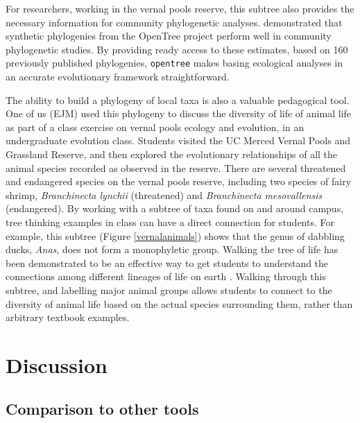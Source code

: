 \documentclass[oupdraft]{sysbio_sse}
\begin{document}
For researchers, working in the vernal pools reserve, this subtree also provides the necessary information for community phylogenetic analyses. \citet{li_for_2019} demonstrated that synthetic phylogenies from the OpenTree project perform well in community phylogenetic studies. By providing ready access to these estimates, based on 160 previously published phylogenies, \texttt{opentree} makes basing ecological analyses in an accurate evolutionary framework straightforward.


The ability to build a phylogeny of local taxa is also a valuable pedagogical tool. One of us (EJM) used this phylogeny to discuss the diversity of life of animal life as part of a class exercise on vernal pools ecology and evolution, in an undergraduate evolution class.
Students visited the UC Merced Vernal Pools and Grassland Reserve, and then explored the evolutionary relationships of all the animal species recorded as observed in the reserve.
There are several threatened and endangered species on the vernal pools reserve, including two species of fairy shrimp, \textit{Branchinecta lynchii} (threatened) and \textit{Branchinecta mesovallensis} (endangered).
By working with a subtree of taxa found on and around campus, tree thinking examples in class can have a direct connection for students. For example, this subtree (Figure \ref{vernalanimals}) shows that the genus of dabbling ducks, \textit{Anas}, does not form a monophyletic group. Walking the tree of life has been demonstrated to be an effective way to get students to understand the connections among different lineages of life on earth \citep{ballen_walking_2017}. Walking through this subtree, and labelling major animal groups allows students to connect to the diversity of animal life based on the actual species surrounding them, rather than arbitrary textbook examples.

\bigskip
\section{Discussion}
\label{sec5}

\subsection{Comparison to other tools}

\end{document}
